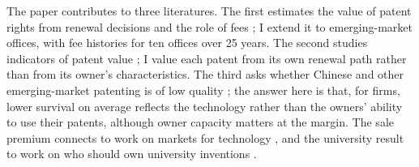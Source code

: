 The paper contributes to three literatures. The first estimates the value of patent rights from renewal decisions
\citep{PakesSchankerman1984,Pakes1986,SchankermanPakes1986,Lanjouw1998,Schankerman1998,LanjouwPakesPutnam1998,Bessen2008}
and the role of fees \citep{deRassenfosseVanPottelsberghe2013}; I extend it to emerging-market
offices, with fee histories for ten offices over 25 years. The second studies indicators of patent value
\citep{HarhoffSchererVopel2003,HallJaffeTrajtenberg2005,KoganEtAl2017}; I value each patent from its own renewal
path rather than from its owner's characteristics. The third asks whether Chinese and other emerging-market patenting
is of low quality \citep{HuJefferson2009,LiegsalzWagner2013,DangMotohashi2015,HuZhangZhao2017,WeiXieZhang2017}; the answer here is that, for firms,
lower survival on average reflects the technology rather than the owners' ability to use their patents, although
owner capacity matters at the margin. The sale premium connects to
work on markets for technology
\citep{AroraFosfuriGambardella2001,Serrano2010,Serrano2018,GalassoSchankermanSerrano2013,AkcigitCelikGreenwood2016},
and the university result to work on who should own university inventions \citep{HvideJones2018}.
